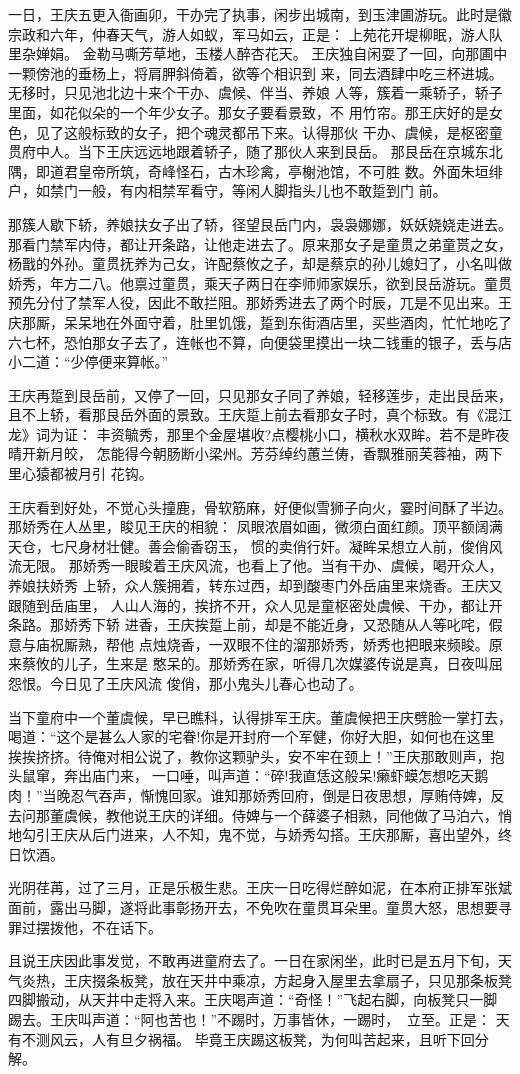 一日，王庆五更入衙画卯，干办完了执事，闲步出城南，到玉津圃游玩。此时是徽
宗政和六年，仲春天气，游人如蚁，军马如云，正是：
上苑花开堤柳眠，游人队里杂婵娟。
金勒马嘶芳草地，玉楼人醉杏花天。
王庆独自闲耍了一回，向那圃中一颗傍池的垂杨上，将肩胛斜倚着，欲等个相识到
来，同去酒肆中吃三杯进城。无移时，只见池北边十来个干办、虞候、伴当、养娘
人等，簇着一乘轿子，轿子里面，如花似朵的一个年少女子。那女子要看景致，不
用竹帘。那王庆好的是女色，见了这般标致的女子，把个魂灵都吊下来。认得那伙
干办、虞候，是枢密童贯府中人。当下王庆远远地跟着轿子，随了那伙人来到艮岳。
那艮岳在京城东北隅，即道君皇帝所筑，奇峰怪石，古木珍禽，亭榭池馆，不可胜
数。外面朱垣绯户，如禁门一般，有内相禁军看守，等闲人脚指头儿也不敢踅到门
前。

那簇人歇下轿，养娘扶女子出了轿，径望艮岳门内，袅袅娜娜，妖妖娆娆走进去。
那看门禁军内侍，都让开条路，让他走进去了。原来那女子是童贯之弟童贳之女，
杨戬的外孙。童贯抚养为己女，许配蔡攸之子，却是蔡京的孙儿媳妇了，小名叫做
娇秀，年方二八。他禀过童贯，乘天子两日在李师师家娱乐，欲到艮岳游玩。童贯
预先分付了禁军人役，因此不敢拦阻。那娇秀进去了两个时辰，兀是不见出来。王
庆那厮，呆呆地在外面守着，肚里饥饿，踅到东街酒店里，买些酒肉，忙忙地吃了
六七杯，恐怕那女子去了，连帐也不算，向便袋里摸出一块二钱重的银子，丢与店
小二道：“少停便来算帐。”

王庆再踅到艮岳前，又停了一回，只见那女子同了养娘，轻移莲步，走出艮岳来，
且不上轿，看那艮岳外面的景致。王庆踅上前去看那女子时，真个标致。有《混江
龙》词为证：
丰资毓秀，那里个金屋堪收?点樱桃小口，横秋水双眸。若不是昨夜晴开新月皎，
怎能得今朝肠断小梁州。芳芬绰约蕙兰俦，香飘雅丽芙蓉袖，两下里心猿都被月引
花钩。

王庆看到好处，不觉心头撞鹿，骨软筋麻，好便似雪狮子向火，霎时间酥了半边。
那娇秀在人丛里，睃见王庆的相貌：
凤眼浓眉如画，微须白面红颜。顶平额阔满天仓，七尺身材壮健。善会偷香窃玉，
惯的卖俏行奸。凝眸呆想立人前，俊俏风流无限。
那娇秀一眼睃着王庆风流，也看上了他。当有干办、虞候，喝开众人，养娘扶娇秀
上轿，众人簇拥着，转东过西，却到酸枣门外岳庙里来烧香。王庆又跟随到岳庙里，
人山人海的，挨挤不开，众人见是童枢密处虞候、干办，都让开条路。那娇秀下轿
进香，王庆挨踅上前，却是不能近身，又恐随从人等叱咤，假意与庙祝厮熟，帮他
点烛烧香，一双眼不住的溜那娇秀，娇秀也把眼来频睃。原来蔡攸的儿子，生来是
憨呆的。那娇秀在家，听得几次媒婆传说是真，日夜叫屈怨恨。今日见了王庆风流
俊俏，那小鬼头儿春心也动了。

当下童府中一个董虞候，早已瞧科，认得排军王庆。董虞候把王庆劈脸一掌打去，
喝道：“这个是甚么人家的宅眷!你是开封府一个军健，你好大胆，如何也在这里
挨挨挤挤。待俺对相公说了，教你这颗驴头，安不牢在颈上！”王庆那敢则声，抱
头鼠窜，奔出庙门来，一口唾，叫声道：“碎!我直恁这般呆!癞虾蟆怎想吃天鹅
肉！”当晚忍气吞声，惭愧回家。谁知那娇秀回府，倒是日夜思想，厚贿侍婢，反
去问那董虞候，教他说王庆的详细。侍婢与一个薛婆子相熟，同他做了马泊六，悄
地勾引王庆从后门进来，人不知，鬼不觉，与娇秀勾搭。王庆那厮，喜出望外，终
日饮酒。

光阴荏苒，过了三月，正是乐极生悲。王庆一日吃得烂醉如泥，在本府正排军张斌
面前，露出马脚，遂将此事彰扬开去，不免吹在童贯耳朵里。童贯大怒，思想要寻
罪过摆拨他，不在话下。

且说王庆因此事发觉，不敢再进童府去了。一日在家闲坐，此时已是五月下旬，天
气炎热，王庆掇条板凳，放在天井中乘凉，方起身入屋里去拿扇子，只见那条板凳
四脚搬动，从天井中走将入来。王庆喝声道：“奇怪！”飞起右脚，向板凳只一脚
踢去。王庆叫声道：“阿也苦也！”不踢时，万事皆休，一踢时，立至。正是：
天有不测风云，人有旦夕祸福。
毕竟王庆踢这板凳，为何叫苦起来，且听下回分解。